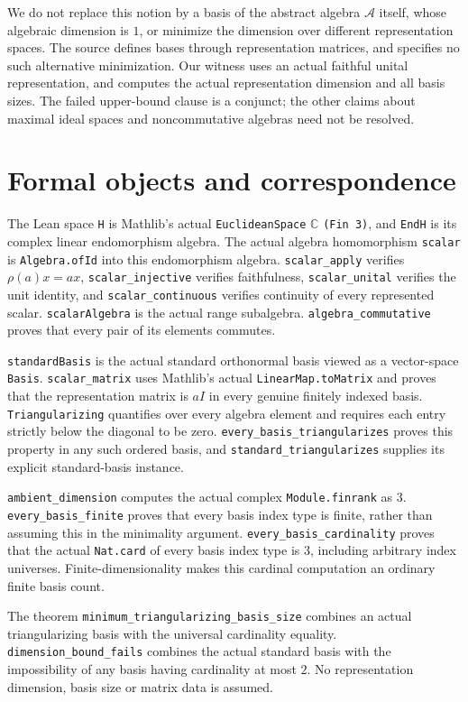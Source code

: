 \documentclass[11pt]{article}
\begin{document}
We do not replace this notion by a basis of the abstract algebra
$\mathcal A$ itself, whose algebraic dimension is $1$, or minimize the
dimension over different representation spaces. The source defines bases
through representation matrices, and specifies no such alternative
minimization. Our witness uses an actual faithful unital representation,
and computes the actual representation dimension and all basis sizes.
The failed upper-bound clause is a conjunct; the other claims about maximal
ideal spaces and noncommutative algebras need not be resolved.

\newpage
\section*{Formal objects and correspondence}
The Lean space \texttt{H} is Mathlib's actual
\texttt{EuclideanSpace} $\mathbb C$ \texttt{(Fin 3)}, and \texttt{EndH}
is its complex linear endomorphism algebra.
The actual algebra homomorphism \texttt{scalar} is
\texttt{Algebra.ofId} into this endomorphism algebra.
\texttt{scalar\_apply} verifies $\rho(a)x=ax$,
\texttt{scalar\_injective} verifies faithfulness,
\texttt{scalar\_unital} verifies the unit identity, and
\texttt{scalar\_continuous} verifies continuity of every represented scalar.
\texttt{scalarAlgebra} is the actual range subalgebra.
\texttt{algebra\_commutative} proves that every pair of its elements commutes.

\texttt{standardBasis} is the actual standard orthonormal basis viewed as
a vector-space \texttt{Basis}.
\texttt{scalar\_matrix} uses Mathlib's actual
\texttt{LinearMap.toMatrix} and proves that the representation matrix is
$aI$ in every genuine finitely indexed basis.
\texttt{Triangularizing} quantifies over every algebra element and requires
each entry strictly below the diagonal to be zero.
\texttt{every\_basis\_triangularizes} proves this property in any such
ordered basis, and \texttt{standard\_triangularizes} supplies its explicit
standard-basis instance.

\texttt{ambient\_dimension} computes the actual complex
\texttt{Module.finrank} as $3$. \texttt{every\_basis\_finite} proves that
every basis index type is finite, rather than assuming this in the
minimality argument. \texttt{every\_basis\_cardinality} proves that the
actual \texttt{Nat.card} of every basis index type is $3$, including
arbitrary index universes. Finite-dimensionality makes this cardinal
computation an ordinary finite basis count.

The theorem \texttt{minimum\_triangularizing\_basis\_size} combines an
actual triangularizing basis with the universal cardinality equality.
\texttt{dimension\_bound\_fails} combines the actual standard basis with
the impossibility of any basis having cardinality at most $2$.
No representation dimension, basis size or matrix data is assumed.
\end{document}
